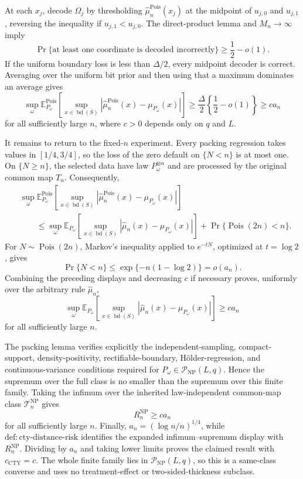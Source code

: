 At each \(x_j\), decode \(\Omega_j\) by thresholding \(\widehat\mu_n^{\mathrm{Pois}}(x_j)\) at the midpoint of \(u_{j,0}\) and \(u_{j,1}\), reversing the inequality if \(u_{j,1}<u_{j,0}\).  The direct-product lemma and \(M_n\to\infty\) imply
\[
 \Pr\{\text{at least one coordinate is decoded incorrectly}\}
 \geq\frac12-o(1).
\]
If the uniform boundary loss is less than \(\Delta/2\), every midpoint decoder is correct.  Averaging over the uniform bit prior and then using that a maximum dominates an average gives
\[
 \sup_\omega
 \mathbb E_{P_\omega}^{\mathrm{Pois}}\!\left[
 \sup_{x\in\operatorname{bd}(S)}
 |\widehat\mu_n^{\mathrm{Pois}}(x)-\mu_{P_\omega}(x)|
 \right]
 \geq\frac{\Delta}{2}\left\{\frac12-o(1)\right\}
 \geq c a_n
\]
for all sufficiently large \(n\), where \(c>0\) depends only on \(q\) and \(L\).

It remains to return to the fixed-\(n\) experiment.  Every packing regression takes values in \([1/4,3/4]\), so the loss of the zero default on \(\{N<n\}\) is at most one.  On \(\{N\geq n\}\), the selected data have law \(P_\omega^{\otimes n}\) and are processed by the original common map \(T_n\).  Consequently,
\[
\begin{aligned}
 &\sup_\omega
 \mathbb E_{P_\omega}^{\mathrm{Pois}}\!\left[
 \sup_{x\in\operatorname{bd}(S)}
 |\widehat\mu_n^{\mathrm{Pois}}(x)-\mu_{P_\omega}(x)|
 \right]\\
 &\qquad\leq
 \sup_\omega
 \mathbb E_{P_\omega}\!\left[
 \sup_{x\in\operatorname{bd}(S)}
 |\widehat\mu_n(x)-\mu_{P_\omega}(x)|
 \right]
 +\Pr\{\operatorname{Pois}(2n)<n\}.
\end{aligned}
\]
For \(N\sim\operatorname{Pois}(2n)\), Markov's inequality applied to \(e^{-tN}\), optimized at \(t=\log2\), gives
\[
 \Pr\{N<n\}
 \leq\exp\{-n(1-\log2)\}
 =o(a_n).
\]
Combining the preceding displays and decreasing \(c\) if necessary proves, uniformly over the arbitrary rule \(\widehat\mu_n\),
\[
 \sup_\omega
 \mathbb E_{P_\omega}\!\left[
 \sup_{x\in\operatorname{bd}(S)}
 |\widehat\mu_n(x)-\mu_{P_\omega}(x)|
 \right]
 \geq c a_n
\]
for all sufficiently large \(n\).

The packing lemma verifies explicitly the independent-sampling, compact-support, density-positivity, rectifiable-boundary, H\"older-regression, and continuous-variance conditions required for \(P_\omega\in\mathcal P_{\mathrm{NP}}(L,q)\).  Hence the supremum over the full class is no smaller than the supremum over this finite family.  Taking the infimum over the inherited law-independent common-map class \(\mathcal T_n^{\mathrm{NP}}\) gives
\[
 R_n^{\mathrm{NP}}\geq c a_n
\]
for all sufficiently large \(n\).  Finally, \(a_n=(\log n/n)^{1/4}\), while \(\mathrm{def:cty\text{-}distance\text{-}risk}\) identifies the expanded infimum--supremum display with \(R_n^{\mathrm{NP}}\).  Dividing by \(a_n\) and taking lower limits proves the claimed result with \(c_{\mathrm{CTY}}=c\).  The whole finite family lies in \(\mathcal P_{\mathrm{NP}}(L,q)\), so this is a same-class converse and uses no treatment-effect or two-sided-thickness subclass.